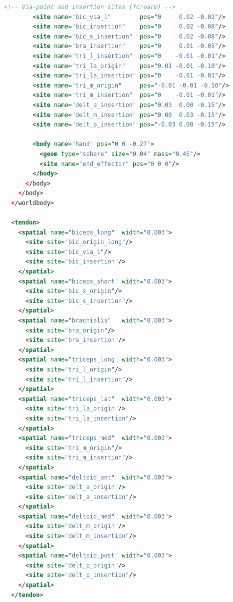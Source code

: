 \begin{lstlisting}[language=XML, caption={Excerpt from the MJCF model file (\texttt{arm.xml}).}, label={lst:mjcf}]
        <!-- Via-point and insertion sites (forearm) -->
        <site name="bic_via_1"        pos="0     0.02 -0.02"/>
        <site name="bic_insertion"    pos="0     0.02 -0.08"/>
        <site name="bic_s_insertion"  pos="0     0.02 -0.08"/>
        <site name="bra_insertion"    pos="0     0.01 -0.05"/>
        <site name="tri_l_insertion"  pos="0    -0.01 -0.01"/>
        <site name="tri_la_origin"    pos="0.01 -0.01 -0.10"/>
        <site name="tri_la_insertion" pos="0    -0.01 -0.01"/>
        <site name="tri_m_origin"     pos="-0.01 -0.01 -0.10"/>
        <site name="tri_m_insertion"  pos="0    -0.01 -0.01"/>
        <site name="delt_a_insertion" pos="0.03  0.00 -0.15"/>
        <site name="delt_m_insertion" pos="0.00  0.03 -0.15"/>
        <site name="delt_p_insertion" pos="-0.03 0.00 -0.15"/>

        <body name="hand" pos="0 0 -0.27">
          <geom type="sphere" size="0.04" mass="0.45"/>
          <site name="end_effector" pos="0 0 0"/>
        </body>
      </body>
    </body>
  </worldbody>

  <tendon>
    <spatial name="biceps_long"  width="0.003">
      <site site="bic_origin_long"/>
      <site site="bic_via_1"/>
      <site site="bic_insertion"/>
    </spatial>
    <spatial name="biceps_short" width="0.003">
      <site site="bic_s_origin"/>
      <site site="bic_s_insertion"/>
    </spatial>
    <spatial name="brachialis"   width="0.003">
      <site site="bra_origin"/>
      <site site="bra_insertion"/>
    </spatial>
    <spatial name="triceps_long" width="0.003">
      <site site="tri_l_origin"/>
      <site site="tri_l_insertion"/>
    </spatial>
    <spatial name="triceps_lat"  width="0.003">
      <site site="tri_la_origin"/>
      <site site="tri_la_insertion"/>
    </spatial>
    <spatial name="triceps_med"  width="0.003">
      <site site="tri_m_origin"/>
      <site site="tri_m_insertion"/>
    </spatial>
    <spatial name="deltoid_ant"  width="0.003">
      <site site="delt_a_origin"/>
      <site site="delt_a_insertion"/>
    </spatial>
    <spatial name="deltoid_med"  width="0.003">
      <site site="delt_m_origin"/>
      <site site="delt_m_insertion"/>
    </spatial>
    <spatial name="deltoid_post" width="0.003">
      <site site="delt_p_origin"/>
      <site site="delt_p_insertion"/>
    </spatial>
  </tendon>


\end{lstlisting}
